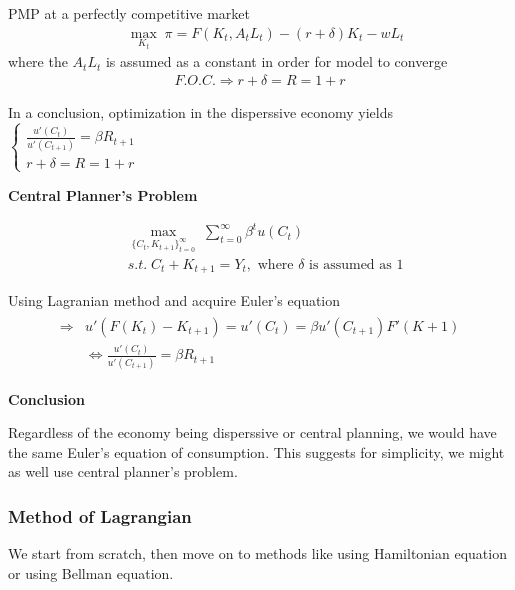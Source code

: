\documentclass{article}
\begin{document}
PMP at a perfectly competitive market
\begin{align}
&\mathop{max}_{K_{t}} \; \pi=F(K_{t},A_{t}L_{t})-(r+\delta)K_{t}-w L_{t}
\end{align}
where the $A_{t}L_{t}$ is assumed as a constant in order for model to converge
\begin{align}
F.O.C. \Rightarrow r+\delta=R=1+r
\end{align}

In a conclusion, optimization in the disperssive economy yields
$\begin{cases}
  \frac{u'(C_{t})}{u'(C_{t+1})}=\beta R_{t+1}\\
  r+\delta=R=1+r
\end{cases}$


\textbf{Central Planner's Problem} 

\begin{equation}
\begin{split}
&\mathop{max}_{\{C_{t},K_{t+1}\}_{t=0}^{\infty}} \; \sum\limits_{t=0}^{\infty} \beta^{t}u(C_{t})
\\& s.t. \; C_{t}+K_{t+1}=Y_{t}, \text{ where } \delta \text{ is assumed as 1}
\end{split}
\end{equation}

Using Lagranian method and acquire Euler's equation
\begin{align}
\begin{split}
\Rightarrow & u'(F(K_{t})-K_{t+1})=u'(C_{t})=\beta u'(C_{t+1})F'(K+1)
\\&\iff \frac{u'(C_{t})}{u'(C_{t+1})}=\beta R_{t+1}
\end{split}
\end{align} 

\textbf{Conclusion}

Regardless of the economy being disperssive or central planning, we would have the same Euler's equation of consumption. This suggests for simplicity, we might as well use central planner's problem.






\subsubsection{Method of Lagrangian}\label{method-of-lagrangian}

We start from scratch, then move on to methods like using Hamiltonian equation or using Bellman equation.
\end{document}
